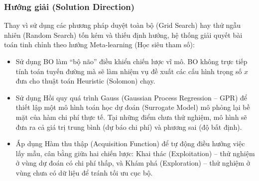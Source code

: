 \documentclass[twoside,12pt]{article}
\begin{document}
\subsubsection{Hướng giải (Solution Direction)}
Thay vì sử dụng các phương pháp duyệt toàn bộ (Grid Search) hay thử ngẫu nhiên (Random Search) tốn kém và thiếu định hướng, hệ thống giải quyết bài toán tinh chỉnh theo hướng Meta-learning (Học siêu tham số):
\begin{itemize}
    \item Sử dụng BO làm ``bộ não'' điều khiển chiến lược vĩ mô. BO không trực tiếp tính toán tuyến đường mà sẽ làm nhiệm vụ đề xuất các cấu hình trọng số $x$ đưa cho thuật toán Heuristic (Solomon) chạy.
    \item Sử dụng Hồi quy quá trình Gauss (Gaussian Process Regression -- GPR) để thiết lập một mô hình toán học dự đoán (Surrogate Model) mô phỏng lại bề mặt của hàm chi phí thực tế. Tại những điểm chưa thử nghiệm, mô hình sẽ đưa ra cả giá trị trung bình (dự báo chi phí) và phương sai (độ bất định).
    \item Áp dụng Hàm thu thập (Acquisition Function) để tự động điều hướng việc lấy mẫu, cân bằng giữa hai chiến lược: Khai thác (Exploitation) -- thử nghiệm ở vùng dự đoán có chi phí thấp, và Khám phá (Exploration) -- thử nghiệm ở vùng chưa có dữ liệu để tránh tối ưu cục bộ.
\end{itemize}
\end{document}
